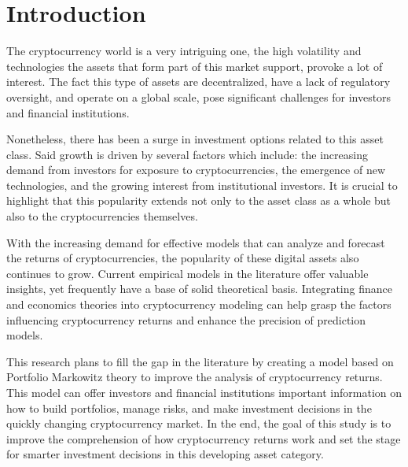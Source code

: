 \chapter{Introduction}
\label{c1} %
The cryptocurrency world is a very intriguing one, the high volatility and technologies the assets that form part of this market support, provoke a lot of interest. The fact this type of assets are decentralized, have a lack of regulatory oversight, and operate on a global scale, pose significant challenges for investors and financial institutions. 

Nonetheless, there has been a surge in investment options related to this asset class. Said growth is driven by several factors which include: the increasing demand from investors for exposure to cryptocurrencies, the emergence of new technologies, and the growing interest from institutional investors. It is crucial to highlight that this popularity extends not only to the asset class as a whole but also to the cryptocurrencies themselves.

With the increasing demand for effective models that can analyze and forecast the returns of cryptocurrencies, the popularity of these digital assets also continues to grow. Current empirical models in the literature offer valuable insights, yet frequently have a base of solid theoretical basis. Integrating finance and economics theories into cryptocurrency modeling can help grasp the factors influencing cryptocurrency returns and enhance the precision of prediction models.

This research plans to fill the gap in the literature by creating a model based on Portfolio Markowitz theory to improve the analysis of cryptocurrency returns. This model can offer investors and financial institutions important information on how to build portfolios, manage risks, and make investment decisions in the quickly changing cryptocurrency market. In the end, the goal of this study is to improve the comprehension of how cryptocurrency returns work and set the stage for smarter investment decisions in this developing asset category.

